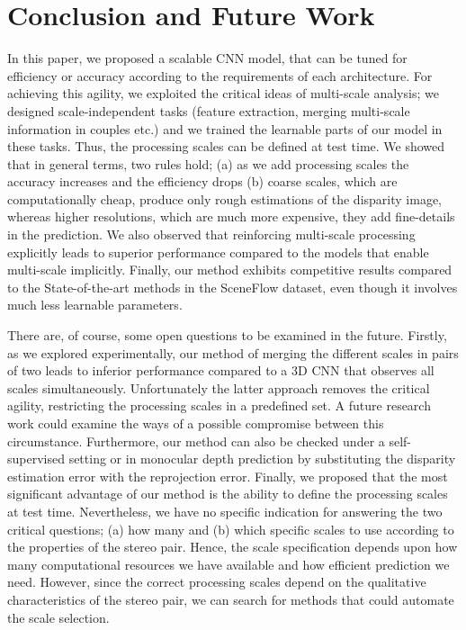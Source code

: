 \documentclass[runningheads]{llncs}
\begin{document}
\section{Conclusion and Future Work}

In this paper, we proposed a scalable CNN model, that can be tuned for efficiency or accuracy according to the requirements of each architecture. For achieving this agility, we exploited the critical ideas of multi-scale analysis; we designed scale-independent tasks (feature extraction, merging multi-scale information in couples etc.) and we trained the learnable parts of our model in these tasks. Thus, the processing scales can be defined at test time. We showed that in general terms, two rules hold; (a) as we add processing scales the accuracy increases and the efficiency drops (b) coarse scales, which are computationally cheap, produce only rough estimations of the disparity image, whereas higher resolutions, which are much more expensive, they add fine-details in the prediction. We also observed that reinforcing multi-scale processing explicitly leads to superior performance compared to the models that enable multi-scale implicitly. Finally, our method exhibits competitive results compared to the State-of-the-art methods in the SceneFlow dataset, even though it involves much less learnable parameters.

There are, of course, some open questions to be examined in the future. Firstly, as we explored experimentally, our method of merging the different scales in pairs of two leads to inferior performance compared to a 3D CNN that observes all scales simultaneously. Unfortunately the latter approach removes the critical agility, restricting the processing scales in a predefined set. A future research work could examine the ways of a possible compromise between this circumstance. Furthermore, our method can also be checked under a self-supervised setting or in monocular depth prediction by substituting the disparity estimation error with the reprojection error. Finally, we proposed that the most significant advantage of our method is the ability to define the processing scales at test time.  Nevertheless, we have no specific indication for answering the two critical questions; (a) how many and (b) which specific scales to use according to the properties of the stereo pair. Hence, the scale specification depends upon how many computational resources we have available and how efficient prediction we need. However, since the correct processing scales depend on the qualitative characteristics of the stereo pair, we can search for methods that could automate the scale selection.

\clearpage


\end{document}
